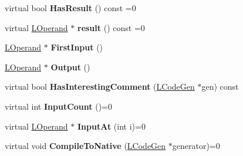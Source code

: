 \begin{DoxyCompactItemize}
\item 
virtual bool {\bfseries Has\+Result} () const  =0\hypertarget{classv8_1_1internal_1_1_l_instruction_af38ca7b40171f2ed75a2970ac7e15fd8}{}\label{classv8_1_1internal_1_1_l_instruction_af38ca7b40171f2ed75a2970ac7e15fd8}

\item 
virtual \hyperlink{classv8_1_1internal_1_1_l_operand}{L\+Operand} $\ast$ {\bfseries result} () const  =0\hypertarget{classv8_1_1internal_1_1_l_instruction_a3c5b856bb92c72dabcf08086abf6f8d7}{}\label{classv8_1_1internal_1_1_l_instruction_a3c5b856bb92c72dabcf08086abf6f8d7}

\item 
\hyperlink{classv8_1_1internal_1_1_l_operand}{L\+Operand} $\ast$ {\bfseries First\+Input} ()\hypertarget{classv8_1_1internal_1_1_l_instruction_ad9675d1c06250b28199f105835b80329}{}\label{classv8_1_1internal_1_1_l_instruction_ad9675d1c06250b28199f105835b80329}

\item 
\hyperlink{classv8_1_1internal_1_1_l_operand}{L\+Operand} $\ast$ {\bfseries Output} ()\hypertarget{classv8_1_1internal_1_1_l_instruction_ac4116b2faee2d8d3f0d7d21a27b40ad4}{}\label{classv8_1_1internal_1_1_l_instruction_ac4116b2faee2d8d3f0d7d21a27b40ad4}

\item 
virtual bool {\bfseries Has\+Interesting\+Comment} (\hyperlink{classv8_1_1internal_1_1_l_code_gen}{L\+Code\+Gen} $\ast$gen) const \hypertarget{classv8_1_1internal_1_1_l_instruction_affae35afdf10150a226c035d47b8ce27}{}\label{classv8_1_1internal_1_1_l_instruction_affae35afdf10150a226c035d47b8ce27}

\item 
virtual int {\bfseries Input\+Count} ()=0\hypertarget{classv8_1_1internal_1_1_l_instruction_a10b5af4413b64db11db6f4dc266b5e4f}{}\label{classv8_1_1internal_1_1_l_instruction_a10b5af4413b64db11db6f4dc266b5e4f}

\item 
virtual \hyperlink{classv8_1_1internal_1_1_l_operand}{L\+Operand} $\ast$ {\bfseries Input\+At} (int i)=0\hypertarget{classv8_1_1internal_1_1_l_instruction_a65f5b87101a6f411d73e5ba9aa13a675}{}\label{classv8_1_1internal_1_1_l_instruction_a65f5b87101a6f411d73e5ba9aa13a675}

\item 
virtual void {\bfseries Compile\+To\+Native} (\hyperlink{classv8_1_1internal_1_1_l_code_gen}{L\+Code\+Gen} $\ast$generator)=0\hypertarget{classv8_1_1internal_1_1_l_instruction_acab3d83fd0de1d783ce5e5e8651009dd}{}\label{classv8_1_1internal_1_1_l_instruction_acab3d83fd0de1d783ce5e5e8651009dd}


\end{DoxyCompactItemize}
